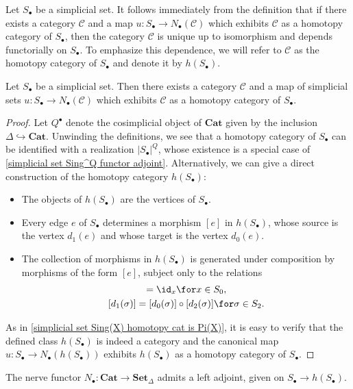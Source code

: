 Let $S_\bullet$ be a simplicial set. It follows immediately from the definition that if there exists a category $\mathcal{C}$ and a map $u:S_\bullet\to N_\bullet(\mathcal{C})$ which exhibits $\mathcal{C}$ as a homotopy category of $S_\bullet$, then the category $\mathcal{C}$ is unique up to isomorphism and depends functorially on $S_\bullet$. To emphasize this dependence, we will refer to $\mathcal{C}$ as the homotopy category of $S_\bullet$ and denote it by $h(S_\bullet)$.
\begin{proposition}\label{simplicial set homotopy cat exist}
Let $S_\bullet$ be a simplicial set. Then there exists a category $\mathcal{C}$ and a map of simplicial sets $u:S_\bullet\to N_\bullet(\mathcal{C})$ which exhibits $\mathcal{C}$ as a homotopy category of $S_\bullet$.
\end{proposition}
\begin{proof}
Let $Q^\bullet$ denote the cosimplicial object of $\mathbf{Cat}$ given by the inclusion $\Delta\hookrightarrow\mathbf{Cat}$. Unwinding the definitions, we see that a homotopy category of $S_\bullet$ can be identified with a realization $|S_\bullet|^Q$, whose existence is a special case of \cref{simplicial set Sing^Q functor adjoint}. Alternatively, we can give a direct construction of the homotopy category $h(S_\bullet)$:
\begin{itemize}
\item The objects of $h(S_\bullet)$ are the vertices of $S_\bullet$.
\item Every edge $e$ of $S_\bullet$ determines a morphism $[e]$ in $h(S_\bullet)$, whose source is the vertex $d_1(e)$ and whose target is the vertex $d_0(e)$.
\item The collection of morphisms in $h(S_\bullet)$ is generated under composition by morphisms of the form $[e]$, subject only to the relations
\begin{gather*}
[s_0(x)]=\id_x\for x\in S_0,\\
[d_1(\sigma)]=[d_0(\sigma)]\circ[d_2(\sigma)]\for \sigma\in S_2.
\end{gather*}
\end{itemize}
As in \cref{simplicial set Sing(X) homotopy cat is Pi(X)}, it is easy to verify that the defined class $h(S_\bullet)$ is indeed a category and the canonical map $u:S_\bullet\to N_\bullet(h(S_\bullet))$ exhibits $h(S_\bullet)$ as a homotopy category of $S_\bullet$. 
\end{proof}
\begin{corollary}\label{simplicial set nerve and homotopy cat adjoint}
The nerve functor $N_\bullet:\mathbf{Cat}\to\mathbf{Set}_\Delta$ admits a left adjoint, given on $S_\bullet\to h(S_\bullet)$.
\end{corollary}
